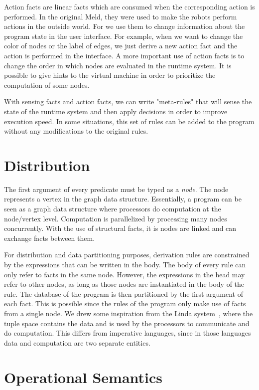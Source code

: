 Action facts are linear facts which are consumed when the corresponding action is performed.
In the original Meld, they were used to make the robots perform actions in the outside world.
For \lang we use them to change information about the program state
in the user interface. For example, when we want to change the color of nodes or the label
of edges, we just derive a new action fact and the action is performed in the interface.
A more important use of action facts is to change the order in which nodes
are evaluated in the runtime system. It is possible to give hints to the virtual
machine in order to prioritize the computation of some nodes.

With sensing facts and action facts, we can write "meta-rules" that will sense the
state of the runtime system and then apply decisions in order to improve execution speed.
In some situations, this set of rules can be added to the program without any modifications
to the original rules.

\section{Distribution}

The first argument of every predicate must be typed as a \emph{node}. The node represents a vertex in the graph data structure.
Essentially, a program can be seen as a graph data structure where processors do computation at the node/vertex level. Computation is
parallelized by processing many nodes concurrently. With the use of structural facts, it is
nodes are linked and can exchange facts between them.

For distribution and data partitioning purposes, derivation rules are constrained by the expressions that can be written in the body.
The body of every rule can only refer to facts in the same node.
However, the expressions in the head may refer to other nodes, as long as those nodes are instantiated in the body of the rule.
The database of the program is then partitioned by the first argument of each fact. This is possible since the rules of the
program only make use of facts from a single node.
We drew some inspiration from the Linda system~\cite{1663305}, where the tuple space contains the data and is used by the processors
to communicate and do computation.
This differs from imperative languages, since in those languages data and computation are two separate entities.

\section{Operational Semantics}

